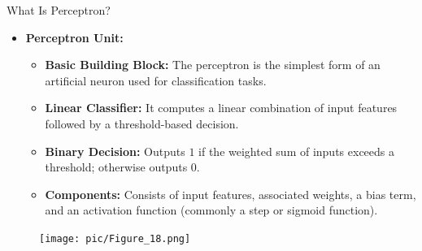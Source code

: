 \documentclass[serif, aspectratio=169]{beamer}
\begin{document}
    \begin{frame}{What Is Perceptron?}
        \begin{itemize}
            \item \textbf{Perceptron Unit:}
            \medskip
            \begin{itemize}\itemsep1em
            \item \justifying \textbf{Basic Building Block:}
            The perceptron is the simplest form of an artificial neuron used for classification tasks.

            \item \justifying \textbf{Linear Classifier:}
            It computes a linear combination of input features followed by a threshold-based decision.

            \item \justifying \textbf{Binary Decision:}
            Outputs \(1\) if the weighted sum of inputs exceeds a threshold; otherwise outputs \(0\).

            \item \justifying \textbf{Components:}
            Consists of input features, associated weights, a bias term, and an activation function (commonly a step or sigmoid function).
            \end{itemize}
        \end{itemize}
        \endminipage
        \hfill
        \begin{figure}
            \centering
            \texttt{[image: pic/Figure\_18.png]}
        \end{figure}
        \endminipage
        \vfill
    \end{frame}
\end{document}
